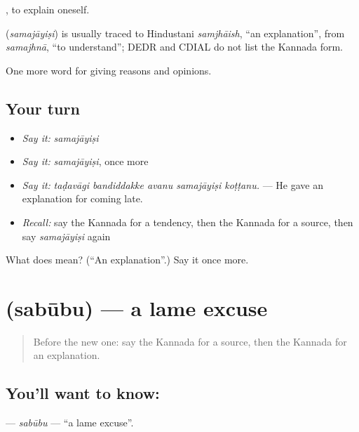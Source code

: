  , to explain oneself.

\begin{cousinweb}
\textbf{} (\emph{samajāyiṣi}) is usually traced to Hindustani \emph{samjhāish}, \textquotedblleft{}an explanation\textquotedblright{}, from \emph{samajhnā}, \textquotedblleft{}to understand\textquotedblright{}; DEDR and CDIAL do not list the Kannada form.
\end{cousinweb}

\begin{grammarlens}[title={What you've built}]
One more word for giving reasons and opinions.
\end{grammarlens}

\subsection*{Your turn}
\begin{itemize}
\raggedright
  \item \emph{Say it:} \emph{samajāyiṣi}
  \item \emph{Say it:} \emph{samajāyiṣi}, once more
  \item \emph{Say it:} \emph{taḍavāgi bandiddakke avanu samajāyiṣi koṭṭanu.} — He gave an explanation for coming late.
  \item \emph{Recall:} say the Kannada for a tendency, then the Kannada for a source, then say \emph{samajāyiṣi} again
\end{itemize}

\begin{tcolorbox}[breakable,colback=teal!4,colframe=teal!35!black,title={Before you move on}]
What does  mean? (\textquotedblleft{}An explanation\textquotedblright{}.) Say it once more.
\end{tcolorbox}
\section[\texorpdfstring{\kn{ಸಬೂಬು} (sabūbu)}{ಸಬೂಬು (sabūbu)}]{ (sabūbu) — a lame excuse}

\label{lesson:KA-C386-sabubu}



\begin{quote}
Before the new one: say the Kannada for a source, then the Kannada for an explanation.
\end{quote}

\subsection*{You'll want to know: }
\textbf{} — \emph{sabūbu} — \textquotedblleft{}a lame excuse\textquotedblright{}.

